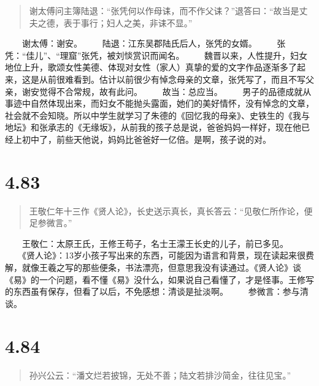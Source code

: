 \documentclass[]{book}
\begin{document}
\begin{quote}
谢太傅问主簿陆退：``张凭何以作母诔，而不作父诔？''退答曰：``故当是丈夫之德，表于事行；妇人之美，非诔不显。''
\end{quote}

　　谢太傅：谢安。 　　陆退：江东吴郡陆氏后人，张凭的女婿。
　　张凭：``佳儿''、``理窟''张凭，被刘惔赏识而闻名。
　　魏晋以来，人性提升，妇女地位上升，歌颂女性美德、体现对女性（家人）真挚的爱的文字作品逐渐多了起来，这是从前很难看到。估计以前很少有悼念母亲的文章，张凭写了，而且不写父亲，谢安觉得不合常规，故有此问。
　　故当：总应当。
　　男子的品德成就从事迹中自然体现出来，而妇女不能抛头露面，她们的美好情怀，没有悼念的文章，社会就不会知晓。所以中学生就学习了朱德的《回忆我的母亲》、史铁生的《我与地坛》和张承志的《无缘坂》，从前我的孩子总是说，爸爸妈妈一样好，现在他已经上初中了，前些天他说，妈妈比爸爸好一亿倍。是啊，孩子说的对。

\section{4.83}\label{section-260}

\begin{quote}
王敬仁年十三作《贤人论》，长史送示真长，真长答云：``见敬仁所作论，便足参微言。''
\end{quote}

　　王敬仁：太原王氏，王修王苟子，名士王濛王长史的儿子，前已多见。
　　《贤人论》：13岁小孩子写出来的东西，可能因为语言和背景，现在读起来很费解，就像王羲之写的那些便条，书法漂亮，但意思我没有读通过。《贤人论》谈《易》的一个问题，看不懂《易》没什么，如果说自己看懂了，才是怪事。王修写的东西虽有保存，但看了以后，不免感想：清谈是扯淡啊。
　　参微言：参与清谈。

\section{4.84}\label{section-261}

\begin{quote}
孙兴公云：``潘文烂若披锦，无处不善；陆文若排沙简金，往往见宝。''
\end{quote}
\end{document}
